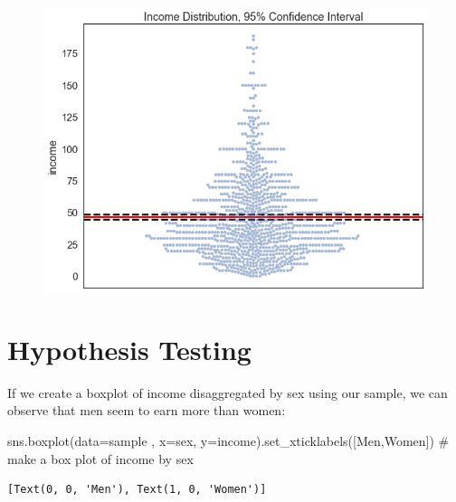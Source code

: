 \documentclass[
  letterpaper,
  DIV=11,
  numbers=noendperiod]{scrreprt}
\newenvironment{Shaded}{\begin{snugshade}}{\end{snugshade}}
\newcommand{\CommentTok}[1]{\textcolor[rgb]{0.37,0.37,0.37}{#1}}
\newcommand{\NormalTok}[1]{\textcolor[rgb]{0.00,0.23,0.31}{#1}}
\newcommand{\OperatorTok}[1]{\textcolor[rgb]{0.37,0.37,0.37}{#1}}
\newcommand{\StringTok}[1]{\textcolor[rgb]{0.13,0.47,0.30}{#1}}
\begin{document}
\begin{figure}[H]

{\centering \includegraphics{notebooks/W07. Distributions and Basic Statistics_files/figure-pdf/cell-34-output-2.png}

}

\end{figure}

\hypertarget{hypothesis-testing}{%
\section{Hypothesis Testing}\label{hypothesis-testing}}

If we create a boxplot of income disaggregated by sex using our sample,
we can observe that men seem to earn more than women:

\begin{Shaded}
\begin{Highlighting}[]
\NormalTok{sns.boxplot(data}\OperatorTok{=}\NormalTok{sample , x}\OperatorTok{=}\StringTok{\textquotesingle{}sex\textquotesingle{}}\NormalTok{, y}\OperatorTok{=}\StringTok{\textquotesingle{}income\textquotesingle{}}\NormalTok{).set\_xticklabels([}\StringTok{\textquotesingle{}Men\textquotesingle{}}\NormalTok{,}\StringTok{\textquotesingle{}Women\textquotesingle{}}\NormalTok{]) }\CommentTok{\# make a box plot of income by sex}
\end{Highlighting}
\end{Shaded}

\begin{verbatim}
[Text(0, 0, 'Men'), Text(1, 0, 'Women')]
\end{verbatim}
\end{document}
